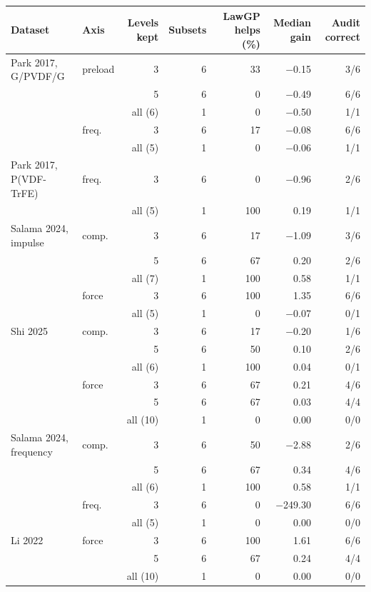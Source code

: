 \begin{tabular}{l l r r r r r}
\toprule
Dataset & Axis & Levels kept & Subsets & LawGP helps (\%) & Median gain & Audit correct \\
\midrule
Park 2017, G/PVDF/G & preload & 3 & 6 & 33 & $-$0.15 & 3/6 \\
 &  & 5 & 6 & 0 & $-$0.49 & 6/6 \\
 & & all (6) & 1 & 0 & $-$0.50 & 1/1 \\
 & freq. & 3 & 6 & 17 & $-$0.08 & 6/6 \\
 & & all (5) & 1 & 0 & $-$0.06 & 1/1 \\
\addlinespace
Park 2017, P(VDF-TrFE) & freq. & 3 & 6 & 0 & $-$0.96 & 2/6 \\
 & & all (5) & 1 & 100 & 0.19 & 1/1 \\
\addlinespace
Salama 2024, impulse & comp. & 3 & 6 & 17 & $-$1.09 & 3/6 \\
 &  & 5 & 6 & 67 & 0.20 & 2/6 \\
 & & all (7) & 1 & 100 & 0.58 & 1/1 \\
 & force & 3 & 6 & 100 & 1.35 & 6/6 \\
 & & all (5) & 1 & 0 & $-$0.07 & 0/1 \\
\addlinespace
Shi 2025 & comp. & 3 & 6 & 17 & $-$0.20 & 1/6 \\
 &  & 5 & 6 & 50 & 0.10 & 2/6 \\
 & & all (6) & 1 & 100 & 0.04 & 0/1 \\
 & force & 3 & 6 & 67 & 0.21 & 4/6 \\
 &  & 5 & 6 & 67 & 0.03 & 4/4 \\
 & & all (10) & 1 & 0 & 0.00 & 0/0 \\
\addlinespace
Salama 2024, frequency & comp. & 3 & 6 & 50 & $-$2.88 & 2/6 \\
 &  & 5 & 6 & 67 & 0.34 & 4/6 \\
 & & all (6) & 1 & 100 & 0.58 & 1/1 \\
 & freq. & 3 & 6 & 0 & $-$249.30 & 6/6 \\
 & & all (5) & 1 & 0 & 0.00 & 0/0 \\
\addlinespace
Li 2022 & force & 3 & 6 & 100 & 1.61 & 6/6 \\
 &  & 5 & 6 & 67 & 0.24 & 4/4 \\
 & & all (10) & 1 & 0 & 0.00 & 0/0 \\
\bottomrule
\end{tabular}
